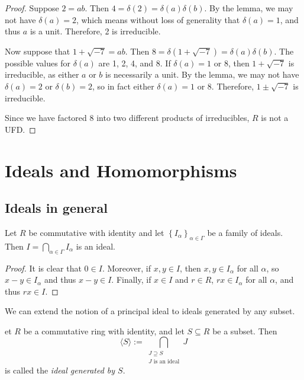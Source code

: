 \documentclass[english,course]{lecture}
\theoremstyle{plain}
\newenvironment{definition}[1]
  {\renewcommand\theinnerdefinition{#1}\innerdefinition}
  {\endinnerdefinition}
\def\set#1{\left\{ {#1} \right\}}
\def\presnotes{}
\begin{document}
\begin{proof}
	Suppose $2 = ab$.
	Then $4 = \delta(2) = \delta(a)\delta(b)$.
	By the lemma, we may not have $\delta(a) = 2$, which means without loss of generality that $\delta(a) = 1$, and thus $a$ is a unit.
	Therefore, 2 is irreducible.
	
	Now suppose that $1 + \sqrt{-7} = ab$.
	Then $8 = \delta(1+\sqrt{-7}) = \delta(a) \delta(b)$.
	The possible values for $\delta(a)$ are 1, 2, 4, and 8.
	If $\delta(a) = 1$ or 8, then $1+\sqrt{-7}$ is irreducible, as either $a$ or $b$ is necessarily a unit.
	By the lemma, we may not have $\delta(a) = 2$ or $\delta(b) = 2$, so in fact either $\delta(a) = 1$ or 8.
	Therefore, $1\pm \sqrt{-7}$ is irreducible.
	
	Since we have factored 8 into two different products of irreducibles, $R$ is not a UFD.
\end{proof}

\presnotes

\clearpage

\section{Ideals and Homomorphisms}\label{Sec-Ideals}


\subsection{Ideals in general}\label{SubSec-Ideals-In-General}


\begin{theorem}
	Let $R$ be commutative with identity and let $\set{I_{\alpha}}_{\alpha\in \Gamma}$ be a family of ideals.
	Then $I = \bigcap\limits_{\alpha\in \Gamma} I_\alpha$ is an ideal.
\end{theorem}

\begin{proof}
	It is clear that $0\in I$.
	Moreover, if $x,y\in I$, then $x,y\in I_\alpha$ for all $\alpha$, so $x-y\in I_\alpha$ and thus $x-y\in I$.
	Finally, if $x\in I$ and $r\in R$, $rx\in I_\alpha$ for all $\alpha$, and thus $rx\in I$.
\end{proof}


We can extend the notion of a principal ideal to ideals generated by any subset.

\begin{definition}
	Let $R$ be a commutative ring with identity, and let $S\subseteq R$ be a subset.
	Then
	\begin{equation}\label{eq:idealgeneratedbyset}
		\langle S \rangle := \bigcap\limits_{\substack{J\supseteq S\\\text{$J$ is an ideal}}} J
	\end{equation}
	is called the \emph{ideal generated by $S$}.
\end{definition}
\end{document}
